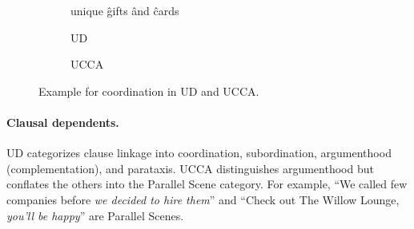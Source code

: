 \documentclass[11pt,a4paper]{article}
\begin{document}

\begin{figure}[th]
  \centering
\begin{subfigure}{.45\columnwidth}
    \begin{dependency}[text only label, label style={above,font=\tt}, font=\small, edge unit distance=1.5ex]
    \begin{deptext}[column sep=.1em,ampersand replacement=\^]
    unique \^ gifts \^ and \^ cards \\
    \end{deptext}
    \end{dependency}
    \caption{UD\label{fig:conj_ud}}
\end{subfigure}
\hfill
\begin{subfigure}{.45\columnwidth}
    \caption{UCCA\label{fig:conj_ucca}}
 \end{subfigure}
 \caption{Example for coordination in UD and UCCA.\label{fig:conj}}
\end{figure}


\paragraph{Clausal dependents.}
UD categorizes clause linkage into coordination,
subordination, argumenthood (complementation),
and parataxis. %
UCCA distinguishes argumenthood 
but conflates the others into the Parallel Scene category.
For example,
``We called few companies before \textit{we decided to hire them}''
and ``Check out The Willow Lounge, \textit{you'll be happy}'' are Parallel Scenes.
\end{document}
